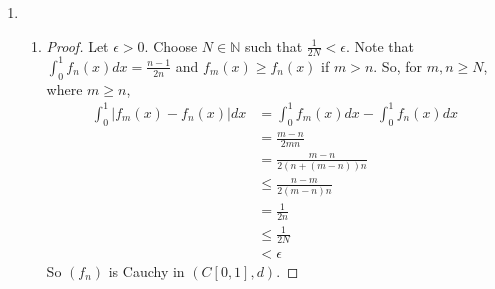 \documentclass[11pt, letterpaper]{article}
\begin{document}
\thispagestyle{firststyle}


\begin{enumerate}
  \item \begin{enumerate}
    \item \begin{proof} Let $\epsilon > 0$. Choose $N \in \mathbb N$ such that $\frac{1}{2N} < \epsilon$. Note that $\int_0^1 f_n(x) dx = \frac{n - 1}{2n}$ and $f_m(x) \geq f_n(x)$ if $m > n$. So, for $m, n \geq N$, where $m \geq n$,
    \begin{align*}
      \int_0^1 \vert f_m(x) - f_n(x) \vert dx
      &= \int_0^1 f_m(x) dx - \int_0^1 f_n(x) dx \\
      &= \frac{m - n}{2mn} \\
      &= \frac{m - n}{2(n + (m - n))n} \\
      &\leq \frac{n - m}{2(m - n)n} \\
      &= \frac{1}{2n} \\
      &\leq \frac{1}{2N} \\
      &< \epsilon
    \end{align*}
    So $(f_n)$ is Cauchy in $(C[0, 1], d)$.
    \end{proof}


\end{enumerate}
\end{enumerate}
\end{document}
